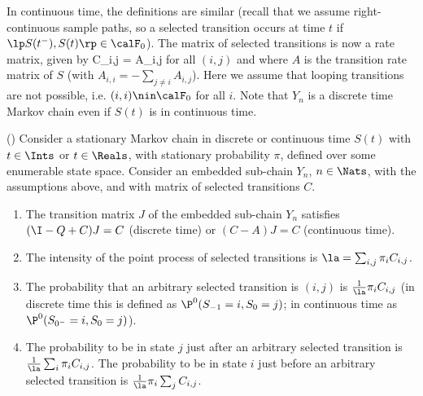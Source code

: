  In continuous time, the definitions are similar (recall that
 we assume right-continuous sample paths, so a selected transition
 occurs at time $t$ if $\lp S(t^-),S(t)\rp \in \calF_0$). The
 matrix of selected
transitions is now a rate matrix, given by
 \ben
 C_{i,j} = A_{i,j} 
 \een for all $(i,j)$ and
 where $A$ is the transition rate matrix of $S$ (with
 $A_{i,i}=-\sum_{j \neq i}A_{i,j}$). Here we assume that looping transitions are
 not possible, i.e. $(i,i) \nin \calF_0$ for all $i$. Note that $Y_n$ is a
 discrete time Markov chain even if $S(t)$ is in continuous time.
%
\begin{shadethm}()
 Consider a stationary Markov chain in
discrete or continuous time $S(t)$ with $t \in \Ints$ or $t\in
\Reals$, with stationary probability $\pi$, defined over some
enumerable state space. Consider an
 embedded sub-chain $Y_n$, $n \in \Nats$, with the assumptions
 above, and with
matrix of selected transitions $C$.
\begin{enumerate}
  \item The transition matrix $J$ of the embedded sub-chain
      $Y_n$ satisfies $ (\I -Q +C)J= C$ (discrete time) or
      $(C-A)J= C$ (continuous time).
  \item The intensity of the point process of selected
      transitions is $\la=\sum_{i,j} \pi_i C_{i,j}$.
   \item The probability that an arbitrary selected
       transition is $(i,j)$ is $\frac{1}{\la}\pi_i
       C_{i,j}$ (in discrete time this is defined as
       $\P^0(S_{-1}=i,S_{0}=j)$; in continuous time as
       $\P^0(S_{0^-}=i,S_{0}=j)$).
    \item The probability to be in state $j$ just after an
        arbitrary selected transition is
        $\frac{1}{\la}\sum_{i}\pi_i C_{i,j}$. The
   probability to be in state $i$ just before an arbitrary
   selected transition is $\frac{1}{\la}\pi_i \sum_{j}
   C_{i,j}$.
\end{enumerate}
\end{shadethm}

%

